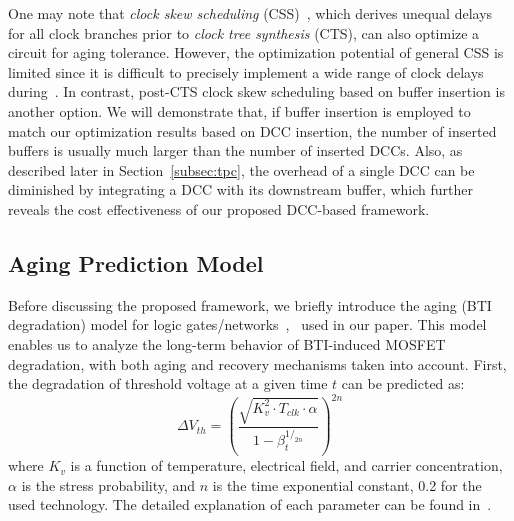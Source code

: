 

One may note that \textit{clock skew scheduling} (CSS)~\cite{fishburn1990clock}, which derives unequal delays for all clock branches prior to \textit{clock tree synthesis} (CTS), can also optimize a circuit for aging tolerance. However, the optimization potential of general CSS is limited since it is difficult to precisely implement a wide range of clock delays during~\cite{li2011optimal}. In contrast, post-CTS clock skew scheduling based on buffer insertion is another option. We will demonstrate that, if buffer insertion is employed to match our optimization results based on DCC insertion, the number of inserted buffers is usually much larger than the number of inserted DCCs. Also, as described later in Section~\ref{subsec:tpc}, the overhead of a single DCC can be diminished by integrating a DCC with its downstream buffer, which further reveals the cost effectiveness of our proposed DCC-based framework.


\subsection{Aging Prediction Model}
\label{subsec:apm}
Before discussing the proposed framework, we briefly introduce the aging (BTI degradation) model for logic gates/networks~\cite{wang2010impact},~\cite{wang2007efficient} used in our paper. This model enables us to analyze the long-term behavior of BTI-induced MOSFET degradation, with both aging and recovery mechanisms taken into account. First, the degradation of threshold voltage at a given time $t$ can be predicted as:
\begin{equation}
\label{eq:dtv}
\Delta V_{th}=\left(\frac{\sqrt{K_v^2 \cdot T_{clk} \cdot \alpha}}{1-\beta_t^{1/_{2n}}}\right)^{2n}
\end{equation}
where $K_v$ is a function of temperature, electrical field, and carrier concentration, $\alpha$ is the stress probability, and $n$ is the time exponential constant, 0.2 for the used technology. The detailed explanation of each parameter can be found in~\cite{wang2010impact}.

